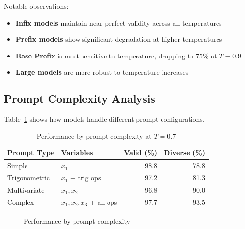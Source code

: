 \documentclass[11pt,a4paper]{article}
\begin{document}
Notable observations:
\begin{itemize}
    \item \textbf{Infix models} maintain near-perfect validity across all temperatures
    \item \textbf{Prefix models} show significant degradation at higher temperatures
    \item \textbf{Base Prefix} is most sensitive to temperature, dropping to 75\% at $T=0.9$
    \item \textbf{Large models} are more robust to temperature increases
\end{itemize}

\subsection{Prompt Complexity Analysis}

Table~\ref{tab:prompt} shows how models handle different prompt configurations.

\begin{table}[H]
\centering
\caption{Performance by prompt complexity at $T=0.7$}
\label{tab:prompt}
\begin{tabular}{llrr}
\toprule
\textbf{Prompt Type} & \textbf{Variables} & \textbf{Valid (\%)} & \textbf{Diverse (\%)} \\
\midrule
Simple & $x_1$ & 98.8 & 78.8 \\
Trigonometric & $x_1$ + trig ops & 97.2 & 81.3 \\
Multivariate & $x_1, x_2$ & 96.8 & 90.0 \\
Complex & $x_1, x_2, x_3$ + all ops & 97.7 & 93.5 \\
\bottomrule
\end{tabular}
\end{table}

\begin{figure}[H]
\centering
{}
\caption{Performance by prompt complexity}
\label{fig:prompt}
\end{figure}
\end{document}
